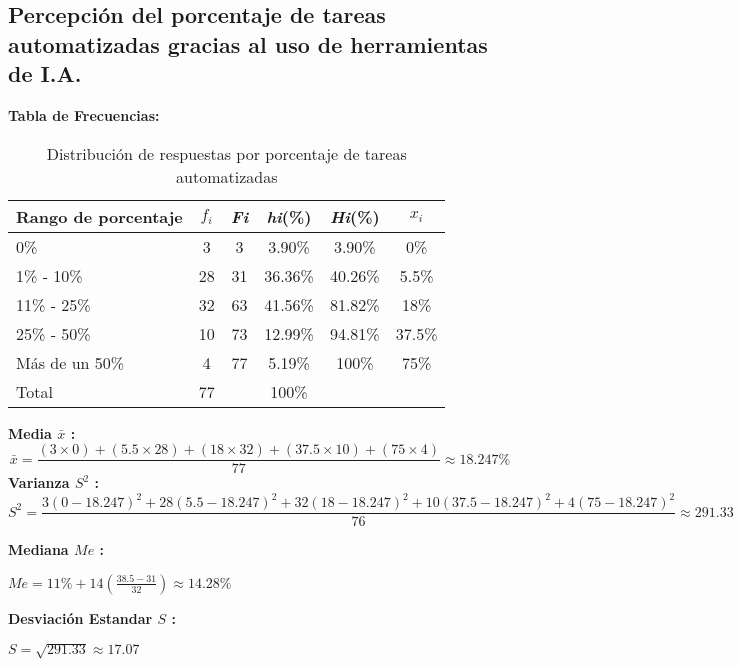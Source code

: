 \subsection{Percepción del porcentaje de tareas automatizadas gracias al uso de herramientas de I.A.}
\vspace{-0.5cm}
\textbf{Tabla de Frecuencias:}

\begin{table}[h!]
	\centering
	\renewcommand{\arraystretch}{1.2}
	\begin{tabular}{l c c c c c}
		\hline
		{Rango de porcentaje} & {\(f_i\)} & \textit{Fi} & \textit{hi}(\%) & \textit{Hi}(\%) & \(x_i\)\\
		\hline
		0\%                  & 3  & 3  & 3.90\%  & 3.90\% & 0\% \\
		1\% - 10\%           & 28 & 31 & 36.36\% & 40.26\% & 5.5\% \\
		11\% - 25\%          & 32 & 63 & 41.56\% & 81.82\% & 18\% \\
		25\% - 50\%          & 10 & 73 & 12.99\% & 94.81\% &37.5\% \\
		Más de un 50\%       & 4  & 77 & 5.19\%  & 100\% & 75\% \\
		\hline
		Total                & 77 &    & 100\%   & & \\
		\hline
	\end{tabular}
	\caption{Distribución de respuestas por porcentaje de tareas automatizadas}
	\label{tabla:porcentaje_IA}
\end{table}
\vspace{-0.5cm}
\textbf{Media $\bar{x}$ :}
\begin{equation*}
	\bar{x} = \frac{(3 \times 0) + (5.5 \times 28) + (18 \times 32) + (37.5 \times 10) + (75 \times 4)}{77} \approx 18.247\%
\end{equation*}
\textbf{Varianza $S^2$ :}
\begin{equation*}
	S^2 = \frac{3(0-18.247)^2 + 28(5.5-18.247)^2 + 32(18-18.247)^2 + 10(37.5 - 18.247)^2 + 4(75 - 18.247)^2}{76} \approx 291.33
\end{equation*}
\begin{multicols}{2}
	\textbf{Mediana $Me$ :}
	\vspace{-0.5cm}
	\begin{center}
		$Me = 11\% + 14(\frac{38.5 - 31}{32}) \approx 14.28\%$
	\end{center}
	\textbf{Desviación Estandar $S$ :}
	\vspace{-0.5cm}
	\begin{center}
		$S = \sqrt{291.33} \approx 17.07$
	\end{center}
\end{multicols}
